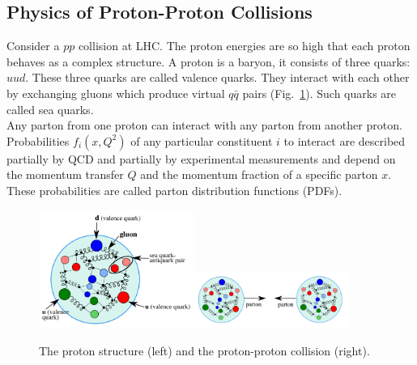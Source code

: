 \subsection{Physics of Proton-Proton Collisions}
\label{sec:Intro_ppCollisions}

Consider a $pp$ collision at LHC. The proton energies are so high that each proton behaves as a complex structure. A proton is a baryon, it consists of three quarks: $uud$. These three quarks are called valence quarks. They interact with each other by exchanging gluons which produce virtual $q\bar{q}$ pairs (Fig.~\ref{fig:ppCollision}). Such quarks are called sea quarks. \\

Any parton from one proton can interact with any parton from another proton. Probabilities $f_i(x,Q^2)$ of any particular constituent $i$ to interact are described partially by QCD and partially by experimental measurements and depend on the momentum transfer $Q$ and the momentum fraction of a specific parton $x$. These probabilities are called parton distribution functions (PDFs).\\

\begin{figure}[htb]
  \begin{center}
    {\includegraphics[width=0.45\textwidth]{../figs/Intro/protonStructure.png}\includegraphics[width=0.45\textwidth]{../figs/Intro/ppCollision.png}}
    \caption{The proton structure (left) and the proton-proton collision (right).}
    \label{fig:ppCollision}
  \end{center}
\end{figure}

